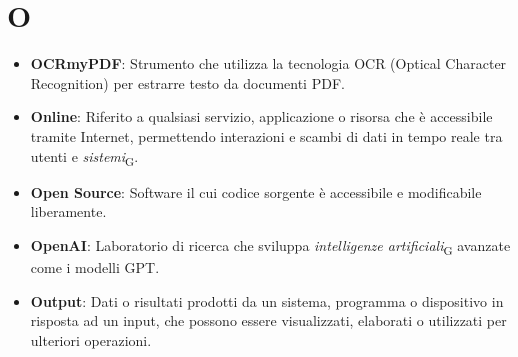\section*{O}  
\begin{itemize}
    \item \textbf{OCRmyPDF}: Strumento che utilizza la tecnologia OCR (Optical Character Recognition) per estrarre testo da documenti PDF.
    \item \textbf{Online}: Riferito a qualsiasi servizio, applicazione o risorsa che è accessibile tramite Internet, permettendo interazioni e scambi di dati in tempo reale tra utenti e \textit{sistemi}\textsubscript{G}.
    \item \textbf{Open Source}: Software il cui codice sorgente è accessibile e modificabile liberamente.
    \item \textbf{OpenAI}: Laboratorio di ricerca che sviluppa \textit{intelligenze artificiali}\textsubscript{G} avanzate come i modelli GPT.
    \item \textbf{Output}: Dati o risultati prodotti da un sistema, programma o dispositivo in risposta ad un input, che possono essere visualizzati, elaborati o utilizzati per ulteriori operazioni.
\end{itemize}
